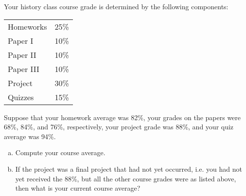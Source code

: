 \documentclass[11pt,letterpaper]{article}
\begin{document}

 Your history class course grade is determined by the following components: \par
	\begin{table}[h]
	\centering
	\begin{tabular}{lr}
	Homeworks & 25\% \\
	Paper I & 10\% \\
	Paper II & 10\% \\
	Paper III & 10\% \\
	Project & 30\% \\
	Quizzes & 15\%
	\end{tabular}
	\end{table} \par
Suppose that your homework average was 82\%, your grades on the papers were 68\%, 84\%, and 76\%, respectively, your project grade was 88\%, and your quiz average was 94\%. 
	\begin{enumerate}[(a)]
	\item Compute your course average.
	\item If the project was a final project that had not yet occurred, i.e. you had not yet received the 88\%, but all the other course grades were as listed above, then what is your current course average?
	\end{enumerate} 
\end{document}
